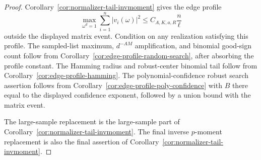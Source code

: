 \documentclass[11pt]{amsart}
\numberwithin{equation}{section}
\theoremstyle{definition}
\theoremstyle{remark}
\begin{document}
\begin{proof}
Corollary~\ref{cor:normalizer-tail-invmoment} gives the edge profile
\[
  \max_{\omega^d=1}\sum_{i=1}^n|v_i(\omega)|^2
  \le C_{A,K,a,R}\frac n\ell
\]
outside the displayed matrix event.  Condition on any realization satisfying
this profile.  The sampled-list maximum, \(d^{-AM}\) amplification, and
binomial good-sign count follow from
Corollary~\ref{cor:edge-profile-random-search}, after absorbing the profile
constant.  The Hamming radius and robust-center binomial tail follow from
Corollary~\ref{cor:edge-profile-hamming}.  The polynomial-confidence robust
search assertion follows from Corollary~\ref{cor:edge-profile-poly-confidence}
with \(B\) there equal to the displayed confidence exponent, followed by a union
bound with the matrix event.

The large-sample replacement is the large-sample part of
Corollary~\ref{cor:normalizer-tail-invmoment}.  The final inverse \(p\)-moment
replacement is also the final assertion of
Corollary~\ref{cor:normalizer-tail-invmoment}.
\end{proof}
\end{document}
